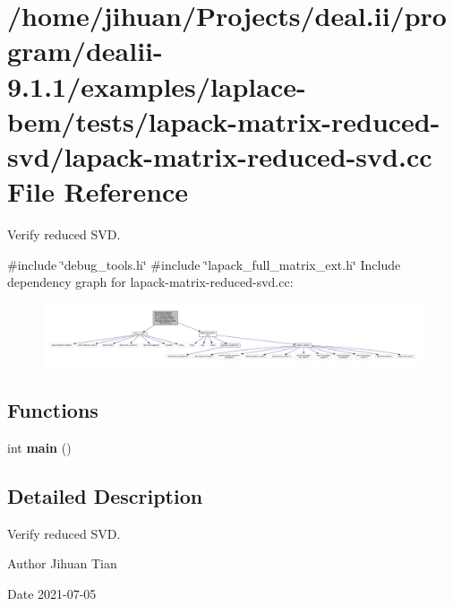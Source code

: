 \hypertarget{lapack-matrix-reduced-svd_8cc}{}\section{/home/jihuan/\+Projects/deal.ii/program/dealii-\/9.1.1/examples/laplace-\/bem/tests/lapack-\/matrix-\/reduced-\/svd/lapack-\/matrix-\/reduced-\/svd.cc File Reference}
\label{lapack-matrix-reduced-svd_8cc}


Verify reduced S\+VD.  


{\ttfamily \#include \char`\"{}debug\+\_\+tools.\+h\char`\"{}}\newline
{\ttfamily \#include \char`\"{}lapack\+\_\+full\+\_\+matrix\+\_\+ext.\+h\char`\"{}}\newline
Include dependency graph for lapack-\/matrix-\/reduced-\/svd.cc\+:\nopagebreak
\begin{figure}[H]
\begin{center}
\leavevmode
\includegraphics[width=350pt]{lapack-matrix-reduced-svd_8cc__incl}
\end{center}
\end{figure}
\subsection*{Functions}
\begin{DoxyCompactItemize}
\item 
\mbox{\label{lapack-matrix-reduced-svd_8cc_ae66f6b31b5ad750f1fe042a706a4e3d4}} 
int {\bfseries main} ()
\end{DoxyCompactItemize}


\subsection{Detailed Description}
Verify reduced S\+VD. 

\begin{DoxyAuthor}{Author}
Jihuan Tian 
\end{DoxyAuthor}
\begin{DoxyDate}{Date}
2021-\/07-\/05 
\end{DoxyDate}
